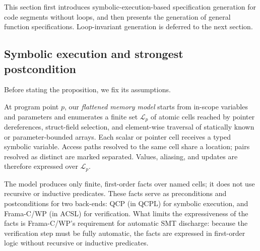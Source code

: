 This section first introduces symbolic-execution-based specification generation for code segments without loops, and then presents the generation of general function specifications. Loop-invariant generation is deferred to the next section.

\subsection{Symbolic execution and strongest postcondition} %
Before stating the proposition, we fix its assumptions. 


At program point $p$, our \emph{flattened memory model} starts from in-scope variables and parameters and enumerates a finite set $\mathcal{L}_p$ of atomic cells reached by pointer dereferences, struct-field selection, and element-wise traversal of statically known or parameter-bounded arrays. Each scalar or pointer cell receives a typed symbolic variable. Access paths resolved to the same cell share a location; pairs resolved as distinct are marked separated. Values, aliasing, and updates are therefore expressed over $\mathcal{L}_p$.

The model produces only finite, first-order facts over named cells; it does not use recursive or inductive predicates. These facts serve as preconditions and postconditions for two back-ends: QCP (in QCPL) for symbolic execution, and Frama-C/WP (in ACSL) for verification. What limits the expressiveness of the facts is Frama-C/WP's requirement for automatic SMT discharge: because the verification step must be fully automatic, the facts are expressed in first-order logic without recursive or inductive predicates. 






